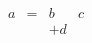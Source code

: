 \documentclass{article}
\begin{document}
\begin{eqnarray}
a &=& b & c\\
&& +d
\end{eqnarray}
\end{document}
